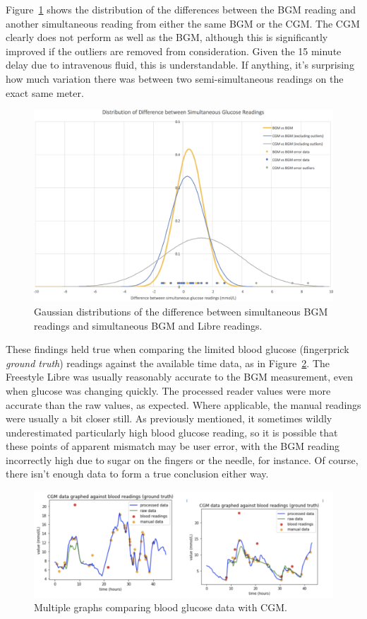Figure~\ref{fig:diffbell} shows the distribution of the differences between the BGM reading and another simultaneous reading from either the same BGM or the CGM. The CGM clearly does not perform as well as the BGM, although this is significantly improved if the outliers are removed from consideration. Given the 15 minute delay due to intravenous fluid, this is understandable. If anything, it’s surprising how much variation there was between two semi-simultaneous readings on the exact same meter.

\begin{figure}[ht]
\centering\includegraphics[width=1.0\linewidth]{images/diffbell.png}
\caption{Gaussian distributions of the difference between simultaneous BGM readings and simultaneous BGM and Libre readings.}
\label{fig:diffbell}
\end{figure}

These findings held true when comparing the limited blood glucose (fingerprick \textit{ground truth}) readings against the available time data, as in Figure~\ref{fig:graph0}. The Freestyle Libre was usually reasonably accurate to the BGM measurement, even when glucose was changing quickly. The processed reader values were more accurate than the raw values, as expected. Where applicable, the manual readings were usually a bit closer still. As previously mentioned, it sometimes wildly underestimated particularly high blood glucose reading, so it is possible that these points of apparent mismatch  may be user error, with the BGM reading incorrectly high due to sugar on the fingers or the needle, for instance. Of course, there isn’t enough data to form a true conclusion either way.


\begin{figure}[ht]
\centering\includegraphics[width=1.0\linewidth]{images/graph0.png}
\caption{Multiple graphs comparing blood glucose data with CGM.}
\label{fig:graph0}
\end{figure}

